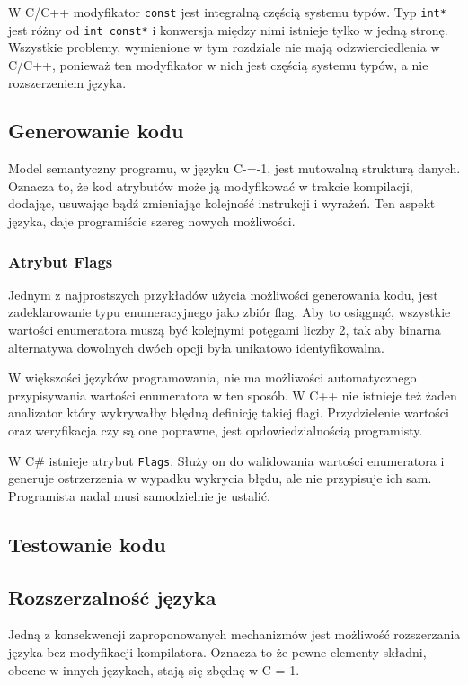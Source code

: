 W C/C++ modyfikator \lstinline{const} jest integralną częścią systemu typów.
Typ \lstinline{int*} jest różny od \lstinline{int const*} i konwersja między nimi istnieje tylko w jedną stronę.
Wszystkie problemy, wymienione w tym rozdziale nie mają odzwierciedlenia w C/C++, ponieważ ten modyfikator w nich jest częścią systemu typów, a nie rozszerzeniem języka.

\subsection{Generowanie kodu}

Model semantyczny programu, w języku C-=-1, jest mutowalną strukturą danych.
Oznacza to, że kod atrybutów może ją modyfikować w trakcie kompilacji, dodając, usuwając bądź zmieniając kolejność instrukcji i wyrażeń.
Ten aspekt języka, daje programiście szereg nowych możliwości.

\subsubsection{Atrybut Flags}

Jednym z najprostszych przykładów użycia możliwości generowania kodu, jest zadeklarowanie typu enumeracyjnego jako zbiór flag.
Aby to osiągnąć, wszystkie wartości enumeratora muszą być kolejnymi potęgami liczby 2, tak aby binarna alternatywa dowolnych dwóch opcji była unikatowo identyfikowalna.%

W większości języków programowania, nie ma możliwości automatycznego przypisywania wartości enumeratora w ten sposób.
W C++ nie istnieje też żaden analizator który wykrywałby błędną definicję takiej flagi.
Przydzielenie wartości oraz weryfikacja czy są one poprawne, jest opdowiedzialnością programisty.

W C\# istnieje atrybut \lstinline{Flags}.
Służy on do walidowania wartości enumeratora i generuje ostrzerzenia w wypadku wykrycia błędu, ale nie przypisuje ich sam.
Programista nadal musi samodzielnie je ustalić.


\subsection{Testowanie kodu}

\subsection{Rozszerzalność języka}
\label{Language_extensibility}
Jedną z konsekwencji zaproponowanych mechanizmów jest możliwość rozszerzania języka bez modyfikacji kompilatora.
Oznacza to że pewne elementy składni, obecne w innych językach, stają się zbędnę w C-=-1.
